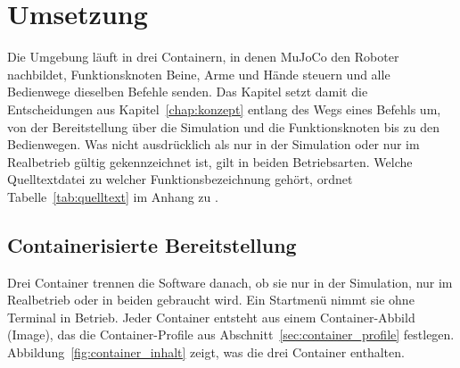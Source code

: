 \chapter{Umsetzung}
\label{chap:umsetzung}


Die Umgebung läuft in drei Containern, in denen MuJoCo den Roboter nachbildet, Funktionsknoten Beine, Arme und Hände steuern und alle Bedienwege dieselben Befehle senden.
Das Kapitel setzt damit die Entscheidungen aus Kapitel~\ref{chap:konzept} entlang des Wegs eines Befehls um, von der Bereitstellung über die Simulation und die Funktionsknoten bis zu den Bedienwegen.
Was nicht ausdrücklich als nur in der Simulation oder nur im Realbetrieb gültig gekennzeichnet ist, gilt in beiden Betriebsarten.
Welche Quelltextdatei zu welcher Funktionsbezeichnung gehört, ordnet Tabelle~\ref{tab:quelltext} im Anhang zu .

\section{Containerisierte Bereitstellung}
\label{sec:bereitstellung}
Drei Container trennen die Software danach, ob sie nur in der Simulation, nur im Realbetrieb oder in beiden gebraucht wird.
Ein Startmenü nimmt sie ohne Terminal in Betrieb.
Jeder Container entsteht aus einem Container-Abbild (Image), das die Container-Profile aus Abschnitt~\ref{sec:container_profile} festlegen.
Abbildung~\ref{fig:container_inhalt} zeigt, was die drei Container enthalten.

